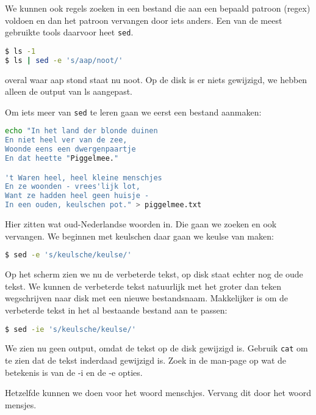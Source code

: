 We kunnen ook regels zoeken in een bestand die aan een bepaald patroon (regex) voldoen en dan het patroon vervangen door iets anders. Een van de meest gebruikte tools daarvoor heet \texttt{sed}.

\begin{lstlisting}[language=bash]
$ ls -1
$ ls | sed -e 's/aap/noot/'
\end{lstlisting}
overal waar aap stond staat nu noot. Op de disk is er niets gewijzigd, we hebben alleen de output van ls aangepast.

Om iets meer van \texttt{sed} te leren gaan we eerst een bestand aanmaken:
\begin{lstlisting}[language=bash]
echo "In het land der blonde duinen
En niet heel ver van de zee,
Woonde eens een dwergenpaartje
En dat heette "Piggelmee."

't Waren heel, heel kleine menschjes
En ze woonden - vrees'lijk lot,
Want ze hadden heel geen huisje -     
In een ouden, keulschen pot." > piggelmee.txt
\end{lstlisting}

Hier zitten wat oud-Nederlandse woorden in. Die gaan we zoeken en ook vervangen. We beginnen met keulschen daar gaan we keulse van maken:
\begin{lstlisting}[language=bash]
$ sed -e 's/keulsche/keulse/'
\end{lstlisting}
Op het scherm zien we nu de verbeterde tekst, op disk staat echter nog de oude tekst. We kunnen de verbeterde tekst natuurlijk met het groter dan teken wegschrijven naar disk met een nieuwe bestandsnaam. Makkelijker is om de verbeterde tekst in het al bestaande bestand aan te passen:
\begin{lstlisting}[language=bash]
$ sed -ie 's/keulsche/keulse/'
\end{lstlisting}
We zien nu geen output, omdat de tekst op de disk gewijzigd is. Gebruik \texttt{cat} om te zien dat de tekst inderdaad gewijzigd is. Zoek in de man-page op wat de betekenis is van de -i en de -e opties.

Hetzelfde kunnen we doen voor het woord menschjes. Vervang dit door het woord mensjes.
